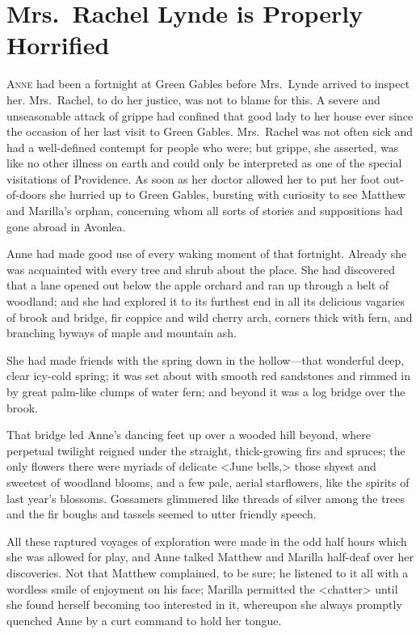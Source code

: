\chapter{Mrs.~Rachel Lynde is Properly Horrified}

\lettrine{A}{nne} had been a fortnight at Green Gables before Mrs.~Lynde arrived to inspect her. Mrs.~Rachel, to do her justice, was not to blame for this. A severe and unseasonable attack of grippe had confined that good lady to her house ever since the occasion of her last visit to Green Gables. Mrs.~Rachel was not often sick and had a well-defined contempt for people who were; but grippe, she asserted, was like no other illness on earth and could only be interpreted as one of the special visitations of Providence. As soon as her doctor allowed her to put her foot out-of-doors she hurried up to Green Gables, bursting with curiosity to see Matthew and Marilla's orphan, concerning whom all sorts of stories and suppositions had gone abroad in Avonlea.

Anne had made good use of every waking moment of that fortnight. Already she was acquainted with every tree and shrub about the place. She had discovered that a lane opened out below the apple orchard and ran up through a belt of woodland; and she had explored it to its furthest end in all its delicious vagaries of brook and bridge, fir coppice and wild cherry arch, corners thick with fern, and branching byways of maple and mountain ash.

She had made friends with the spring down in the hollow—that wonderful deep, clear icy-cold spring; it was set about with smooth red sandstones and rimmed in by great palm-like clumps of water fern; and beyond it was a log bridge over the brook.

That bridge led Anne's dancing feet up over a wooded hill beyond, where perpetual twilight reigned under the straight, thick-growing firs and spruces; the only flowers there were myriads of delicate <June bells,> those shyest and sweetest of woodland blooms, and a few pale, aerial starflowers, like the spirits of last year's blossoms. Gossamers glimmered like threads of silver among the trees and the fir boughs and tassels seemed to utter friendly speech.

All these raptured voyages of exploration were made in the odd half hours which she was allowed for play, and Anne talked Matthew and Marilla half-deaf over her discoveries. Not that Matthew complained, to be sure; he listened to it all with a wordless smile of enjoyment on his face; Marilla permitted the <chatter> until she found herself becoming too interested in it, whereupon she always promptly quenched Anne by a curt command to hold her tongue.

